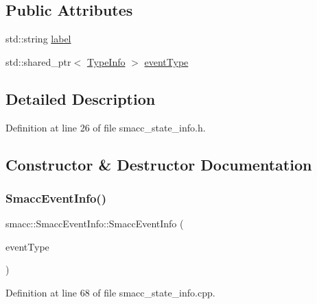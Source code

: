 \subsection*{Public Attributes}
\begin{DoxyCompactItemize}
\item 
std\+::string \hyperlink{structsmacc_1_1introspection_1_1SmaccEventInfo_a2bbed6ad8013758e23761c92d70c2fd1}{label}
\item 
std\+::shared\+\_\+ptr$<$ \hyperlink{classsmacc_1_1introspection_1_1TypeInfo}{Type\+Info} $>$ \hyperlink{structsmacc_1_1introspection_1_1SmaccEventInfo_af3bdf1abf797864e681662d92a5515f9}{event\+Type}
\end{DoxyCompactItemize}


\subsection{Detailed Description}


Definition at line 26 of file smacc\+\_\+state\+\_\+info.\+h.



\subsection{Constructor \& Destructor Documentation}
\mbox{\label{structsmacc_1_1introspection_1_1SmaccEventInfo_a322035851e387c9cb58bc1cfe4c68544}} 
\subsubsection{\texorpdfstring{Smacc\+Event\+Info()}{SmaccEventInfo()}}
{\footnotesize\ttfamily smacc\+::\+Smacc\+Event\+Info\+::\+Smacc\+Event\+Info (\begin{DoxyParamCaption}\item[{std\+::shared\+\_\+ptr$<$ \hyperlink{classsmacc_1_1introspection_1_1TypeInfo}{Type\+Info} $>$}]{event\+Type }\end{DoxyParamCaption})}



Definition at line 68 of file smacc\+\_\+state\+\_\+info.\+cpp.



